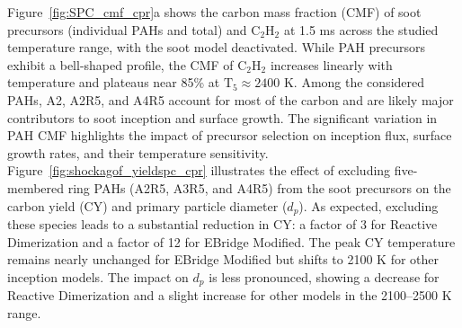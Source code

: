 
Figure~\ref{fig:SPC_cmf_cpr}a shows the carbon mass fraction (CMF) of soot precursors (individual PAHs and total) and $\mathrm{C_2H_2}$ at 1.5 ms across the studied temperature range, with the soot model deactivated. While PAH precursors exhibit a bell-shaped profile, the CMF of $\mathrm{C_2H_2}$ increases linearly with temperature and plateaus near 85\% at $\mathrm{T_5} \approx 2400$ K. Among the considered PAHs, A2, A2R5, and A4R5 account for most of the carbon and are likely major contributors to soot inception and surface growth. The significant variation in PAH CMF highlights the impact of precursor selection on inception flux, surface growth rates, and their temperature sensitivity. Figure~\ref{fig:shockagof_yieldspc_cpr} illustrates the effect of excluding five-membered ring PAHs (A2R5, A3R5, and A4R5) from the soot precursors on the carbon yield (CY) and primary particle diameter ($d_p$). As expected, excluding these species leads to a substantial reduction in CY: a factor of 3 for Reactive Dimerization and a factor of 12 for EBridge Modified. The peak CY temperature remains nearly unchanged for EBridge Modified but shifts to 2100 K for other inception models. The impact on $d_p$ is less pronounced, showing a decrease for Reactive Dimerization and a slight increase for other models in the 2100--2500 K range.

